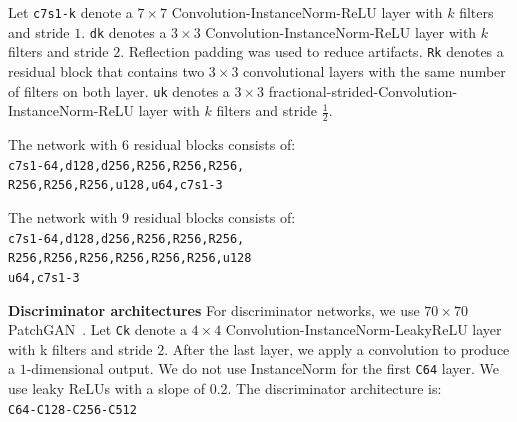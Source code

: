 Let \texttt{c7s1-k} denote a $7\times7$ Convolution-InstanceNorm-ReLU layer with $k$ filters and stride $1$. \texttt{dk} denotes a $3\times3$ Convolution-InstanceNorm-ReLU layer with $k$ filters and stride $2$. Reflection padding was used to reduce artifacts. \texttt{Rk} denotes a residual block that contains two $3\times3$ convolutional layers with the same number of filters on both layer. \texttt{uk} denotes a $3\times3$ fractional-strided-Convolution-InstanceNorm-ReLU layer with $k$ filters and stride $\frac{1}{2}$. 


The network with 6 residual blocks consists of:\\
\texttt{c7s1-64,d128,d256,R256,R256,R256,\\
R256,R256,R256,u128,u64,c7s1-3}

The network with 9 residual blocks consists of:\\
\texttt{c7s1-64,d128,d256,R256,R256,R256,\\
R256,R256,R256,R256,R256,R256,u128} \\
\texttt{u64,c7s1-3}


{\bf Discriminator architectures}
For discriminator networks, we use $70\times 70$ PatchGAN~\cite{isola2016image}. 
Let \texttt{Ck} denote a $4\times4$ Convolution-InstanceNorm-LeakyReLU layer with k filters and stride $2$. After the last layer, we apply a convolution to produce a $1$-dimensional output. We do not use InstanceNorm for the first \texttt{C64} layer. We use leaky ReLUs with a slope of $0.2$. The discriminator architecture is:\\
\texttt{C64-C128-C256-C512}
